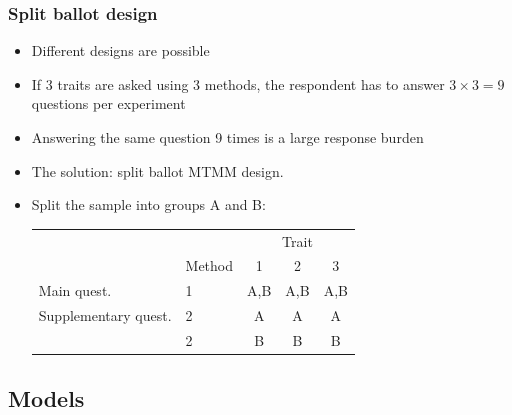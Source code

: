 \documentclass{beamer}
\begin{document}
\begin{frame}	
	\frametitle{Split ballot design}

	\begin{itemize}[<alert@+>]
		\item Different designs are possible
		\item If 3 traits are asked using 3 methods, the respondent has to answer 
			$3 \times 3 = 9$ questions per experiment
		\item Answering the same question 9 times is a large response burden
		\item The solution: split ballot MTMM design.
\item<5-|alert@5> {
	Split the sample into groups A and B:

	\begin{tabular}{llccc}
\hline
		&&\multicolumn{3}{c}{Trait}\\
		& Method & 1 & 2 & 3\\
\hline
		Main quest. 	& 1 & A,B & A,B & A,B\\
		Supplementary quest.	& 2 & A & A & A\\
							& 2 & B & B & B\\
\hline
	\end{tabular}	}
	\end{itemize}

\end{frame}	

\subsection{Models}
\end{document}
